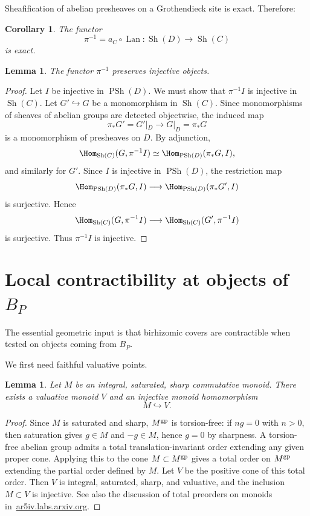 \documentclass{article}
\newtheorem{lem}[thm]{Lemma}
\newtheorem{cor}[thm]{Corollary}
\theoremstyle{remark}
\DeclareMathOperator{\Sh}{Sh}
\DeclareMathOperator{\PSh}{PSh}
\DeclareMathOperator{\Lan}{Lan}
\begin{document}
Sheafification of abelian presheaves on a Grothendieck site is exact.  Therefore:

\begin{cor}\label{cor:pi-inv-exact}
The functor
\[
\pi^{-1}=a_C\circ \Lan:\Sh(D)\to \Sh(C)
\]
is exact.
\end{cor}

\begin{lem}\label{lem:preserves-injectives}
The functor $\pi^{-1}$ preserves injective objects.
\end{lem}
\begin{proof}
Let $I$ be injective in $\PSh(D)$.  We must show that $\pi^{-1}I$ is injective in $\Sh(C)$.  Let $G'\hookrightarrow G$ be a monomorphism in $\Sh(C)$.  Since monomorphisms of sheaves of abelian groups are detected objectwise, the induced map
\[
\pi_*G'=G'|_D\longrightarrow G|_D=\pi_*G
\]
is a monomorphism of presheaves on $D$.  By adjunction,
\[
\Hom_{\Sh(C)}(G,\pi^{-1}I)
\simeq
\Hom_{\PSh(D)}(\pi_*G,I),
\]
and similarly for $G'$.  Since $I$ is injective in $\PSh(D)$, the restriction map
\[
\Hom_{\PSh(D)}(\pi_*G,I)
\longrightarrow
\Hom_{\PSh(D)}(\pi_*G',I)
\]
is surjective.  Hence
\[
\Hom_{\Sh(C)}(G,\pi^{-1}I)
\longrightarrow
\Hom_{\Sh(C)}(G',\pi^{-1}I)
\]
is surjective.  Thus $\pi^{-1}I$ is injective.
\end{proof}

\section{Local contractibility at objects of $B_P$}\label{sec:contract}

The essential geometric input is that birhizomic covers are contractible when tested on objects coming from $B_P$.

We first need faithful valuative points.

\begin{lem}\label{lem:faithful-valuative}
Let $M$ be an integral, saturated, sharp commutative monoid.  There exists a valuative monoid $V$ and an injective monoid homomorphism
\[
M\hookrightarrow V.
\]
\end{lem}
\begin{proof}
Since $M$ is saturated and sharp, $M^{\rm gp}$ is torsion-free: if $ng=0$ with $n>0$, then saturation gives $g\in M$ and $-g\in M$, hence $g=0$ by sharpness.  A torsion-free abelian group admits a total translation-invariant order extending any given proper cone.  Applying this to the cone $M\subset M^{\rm gp}$ gives a total order on $M^{\rm gp}$ extending the partial order defined by $M$.  Let $V$ be the positive cone of this total order.  Then $V$ is integral, saturated, sharp, and valuative, and the inclusion $M\subset V$ is injective.  See also the discussion of total preorders on monoids in~\href{https://ar5iv.labs.arxiv.org/html/2607.07473}{ar5iv.labs.arxiv.org}.
\end{proof}
\end{document}
